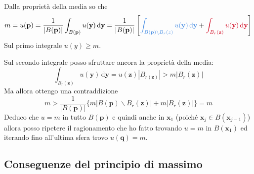 \documentclass[10pt,a4paper,twoside,openright]{book}
\newcommand{\x}{\mathbf{x}}
\newcommand{\y}{\mathbf{y}}
\newcommand{\de}{\,\mathrm d}
\newcommand{\dyy}{\de \y}
\begin{document}
\begin{dimostrazione}
\begin{figure}[H]
\begin{tikzpicture}[x=0.75pt,y=0.75pt,yscale=-1,xscale=1]
        \end{tikzpicture}
    \end{figure}
    \FloatBarrier

    Dalla proprietà della media so che
    \begin{equation*}
        m=u(\mathbf{p}) =\frac{1}{| B(\mathbf{p})| }\int _{B(\mathbf{p})} u(\y) \dyy=\frac{1}{| B(\mathbf{p})| }\left[\textcolor[rgb]{0.29,0.56,0.89}{\int _{B(\mathbf{p}) \backslash B_{r}(z)} u(\y) \dyy} +\textcolor[rgb]{0.82,0.01,0.11}{\int _{B_{r}(\mathbf{z})} u(\y) \dyy}\right]
    \end{equation*}
    Sul primo integrale $u(y) \geqslant m$.

    Sul secondo integrale posso sfruttare ancora la proprietà della media:
    \begin{equation*}
        \int _{B_{r}(\mathbf{z})} u(\y) \dyy=u(\mathbf{z})| B_{r(\mathbf{z})}|  >m| B_{r}(\mathbf{z})|
    \end{equation*}
    Ma allora ottengo una contraddizione
    \begin{equation*}
        m >\frac{1}{| B(\mathbf{p})| }\{m| B(\mathbf{p}) \backslash B_{r}(\mathbf{z})| +m| B_{r}(\mathbf{z})| \} =m
    \end{equation*}
    Deduco che $u=m$ in tutto $B(\mathbf{p})$ e quindi anche in $\x_{1}$ (poiché $\x_{j} \in B(\x_{j-1})$) allora posso ripetere il ragionamento che ho fatto trovando $u=m$ in $B(\x_{1})$ ed iterando fino all'ultima sfera trovo $u(\mathbf{q}) =m$.
\end{dimostrazione}
\subsection{Conseguenze del principio di massimo}
\end{document}
